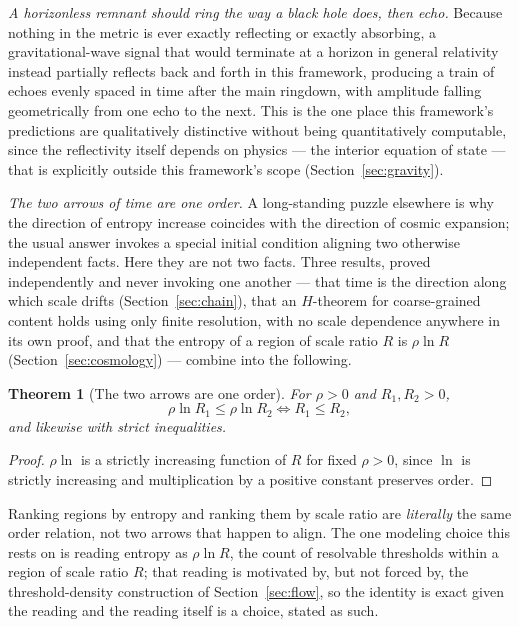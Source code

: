 \documentclass[pdflatex,sn-mathphys-num]{sn-jnl}
\theoremstyle{thmstyleone}
\newtheorem{theorem}{Theorem}
\theoremstyle{thmstylethree}
\theoremstyle{thmstyletwo}
\begin{document}
\emph{A horizonless remnant should ring the way a black hole does, then
echo.} Because nothing in the metric is ever exactly reflecting or
exactly absorbing, a gravitational-wave signal that would terminate at a
horizon in general relativity instead partially reflects back and forth
in this framework, producing a train of echoes evenly spaced in time
after the main ringdown, with amplitude falling geometrically from one
echo to the next. This is the one place this framework's predictions are
qualitatively distinctive without being quantitatively computable, since
the reflectivity itself depends on physics — the interior equation of
state — that is explicitly outside this framework's scope
(Section~\ref{sec:gravity}).

\emph{The two arrows of time are one order.} A long-standing puzzle
elsewhere is why the direction of entropy increase coincides with the
direction of cosmic expansion; the usual answer invokes a special
initial condition aligning two otherwise independent facts. Here they
are not two facts. Three results, proved independently and never
invoking one another — that time is the direction along which scale
drifts (Section~\ref{sec:chain}), that an $H$-theorem for coarse-grained
content holds using only finite resolution, with no scale dependence
anywhere in its own proof, and that the entropy of a region of scale
ratio $R$ is $\rho \ln R$ (Section~\ref{sec:cosmology}) — combine into
the following.

\begin{theorem}[The two arrows are one order]\label{thm:onearrow}
For $\rho>0$ and $R_1,R_2>0$,
\[
\rho\ln R_1 \le \rho\ln R_2 \iff R_1\le R_2,
\]
and likewise with strict inequalities.
\end{theorem}
\begin{proof}
$\rho \ln$ is a strictly increasing function of $R$ for fixed $\rho > 0$,
since $\ln$ is strictly increasing and multiplication by a positive
constant preserves order.
\end{proof}

Ranking regions by entropy and ranking them by scale ratio are
\emph{literally} the same order relation, not two arrows that happen to
align. The one modeling choice this rests on is reading entropy as
$\rho \ln R$, the count of resolvable thresholds within a region of scale
ratio $R$; that reading is motivated by, but not forced by, the
threshold-density construction of Section~\ref{sec:flow}, so the identity
is exact given the reading and the reading itself is a choice, stated as
such.
\end{document}

